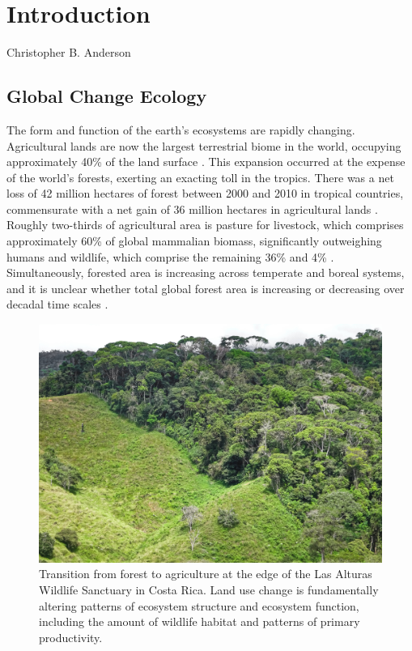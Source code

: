 \chapter{Introduction}

Christopher B. Anderson

\section{Global Change Ecology}

The form and function of the earth's ecosystems are rapidly changing. Agricultural lands are now the largest terrestrial biome in the world, occupying approximately 40\% of the land surface \cite{Foley2005-la, Springmann2018-nr}. This expansion occurred at the expense of the world's forests, exerting an exacting toll in the tropics. There was a net loss of 42 million hectares of forest between 2000 and 2010 in tropical countries, commensurate with a net gain of 36 million hectares in agricultural lands \cite{Fao2016-yn}. Roughly two-thirds of agricultural area is pasture for livestock, which comprises approximately 60\% of global mammalian biomass, significantly outweighing humans and wildlife, which comprise the remaining 36\% and 4\% \cite{Ramankutty2008-lc, Bar-On2018-vj}. Simultaneously, forested area is increasing across temperate and boreal systems, and it is unclear whether total global forest area is increasing or decreasing over decadal time scales \cite{ Hansen2013-oz, Song2018-qd}.

\begin{figure}[!ht]
\includegraphics[width=\textwidth]{figures/intro-las-alturas.jpg}
\centering
\caption[Transition from forest to agriculture at the edge of the Las Alturas Wildlife Sanctuary in Costa Rica.]{Transition from forest to agriculture at the edge of the Las Alturas Wildlife Sanctuary in Costa Rica. Land use change is fundamentally altering patterns of ecosystem structure and ecosystem function, including the amount of wildlife habitat and patterns of primary productivity.}
\label{fig:las-alturas}
\end{figure}


